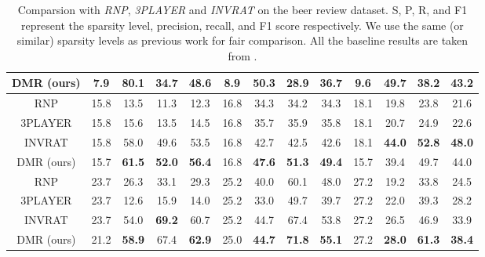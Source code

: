 \documentclass[letterpaper]{article} %
\begin{document}
\begin{table*}[!ht]
\begin{tabular}{c|cccc|cccc|cccc}
DMR (ours)                                        & 7.9  & \textbf{80.1} & \textbf{34.7} & \textbf{48.6}          & 8.9  & \textbf{50.3}          & \textbf{28.9} & \textbf{36.7}          & 9.6  & \textbf{49.7} & \textbf{38.2} & \textbf{43.2}          \\ \hline
RNP                                        & 15.8 & 13.5          & 11.3          & 12.3                   & 16.8 & 34.3          & 34.2          & 34.3                   & 18.1 & 19.8          & 23.8          & 21.6                   \\
3PLAYER                                    & 15.8 & 15.6          & 13.5          & 14.5                   & 16.8 & 35.7          & 35.9          & 35.8                   & 18.1 & 20.7          & 24.9          & 22.6                   \\
INVRAT                                     & 15.8 & 58.0          & 49.6          & 53.5                   & 16.8 & 42.7          & 42.5          & 42.6                   & 18.1 & \textbf{44.0} & \textbf{52.8}          & \textbf{48.0}                   \\

DMR (ours)                                        & 15.7 & \textbf{61.5} & \textbf{52.0} & \textbf{56.4}          & 16.8 & \textbf{47.6} & \textbf{51.3} & \textbf{49.4}          & 15.7 & 39.4          & 49.7 & 44.0          \\ \hline
RNP                                        & 23.7 & 26.3          & 33.1          & 29.3                   & 25.2 & 40.0          & 60.1          & 48.0                   & 27.2 & 19.2          & 33.8          & 24.5                   \\
3PLAYER                                    & 23.7 & 12.6          & 15.9          & 14.0                   & 25.2 & 33.0          & 49.7          & 39.7                   & 27.2 & 22.0          & 39.3          & 28.2                   \\
    INVRAT                                     & 23.7 & 54.0          & \textbf{69.2}          & 60.7                   & 25.2 & 44.7 & 67.4          & 53.8                   & 27.2 & 26.5          & 46.9          & 33.9                   \\

DMR (ours)                                        & 21.2 & \textbf{58.9} & 67.4 & \textbf{62.9}          & 25.0 & \textbf{44.7}          & \textbf{71.8} & \textbf{55.1}          & 27.2 & \textbf{28.0} & \textbf{61.3} & \textbf{38.4}          \\ \hline
\end{tabular}
    \caption{\normalsize Comparsion with \emph{RNP}, \emph{3PLAYER} and \emph{INVRAT} on the beer review dataset. S, P, R, and F1 represent the sparsity level, precision, recall, and F1 score respectively. We use the same (or similar) sparsity levels as previous work for fair comparison. All the baseline results are taken from \cite{chang2020invariant}.}
    \label{tab:table_invariant}
\end{table*}
\end{document}
